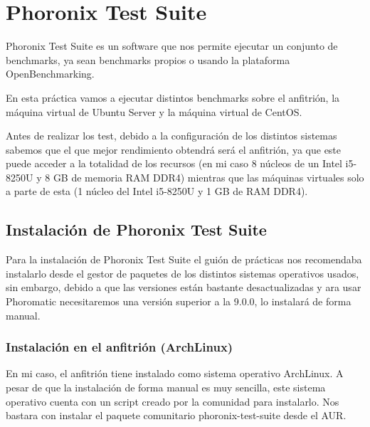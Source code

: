 \documentclass[12pt, spanish]{article}
\begin{document}

\tableofcontents
\pagebreak



\section{Phoronix Test Suite}

Phoronix Test Suite\cite{pts} es un software que nos permite ejecutar un conjunto de benchmarks, ya sean benchmarks propios o usando la plataforma OpenBenchmarking\cite{obm}.

En esta práctica vamos a ejecutar distintos benchmarks sobre el anfitrión, la máquina virtual de Ubuntu Server y la máquina virtual de CentOS.

Antes de realizar los test, debido a la configuración de los distintos sistemas sabemos que el que mejor rendimiento obtendrá será el anfitrión, ya que este puede acceder a la totalidad de los recursos (en mi caso 8 núcleos de un Intel i5-8250U y 8 GB de memoria RAM DDR4) mientras que las máquinas virtuales solo a parte de esta (1 núcleo del Intel i5-8250U y 1 GB de RAM DDR4).

\subsection{Instalación de Phoronix Test Suite}

Para la instalación de Phoronix Test Suite el guión de prácticas nos recomendaba instalarlo desde el gestor de paquetes de los distintos sistemas operativos usados, sin embargo, debido a que las versiones están bastante desactualizadas y ara usar Phoromatic necesitaremos una versión superior a la 9.0.0, lo instalará de forma manual.

\subsubsection{Instalación en el anfitrión (ArchLinux)}

En mi caso, el anfitrión tiene instalado como sistema operativo ArchLinux. A pesar de que la instalación de forma manual es muy sencilla, este sistema operativo cuenta con un script creado por la comunidad para instalarlo. Nos bastara con instalar el paquete comunitario phoronix-test-suite desde el AUR.
\end{document}
